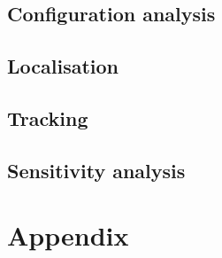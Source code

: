 \documentclass[10pt,a4paper]{report}
\begin{document}
\newpage
\section{Configuration analysis}
\label{Configuration analysis}

\newpage
\section{Localisation}
\label{Localisationg}

\newpage
\section{Tracking}
\label{Tracking}

\newpage
\section{Sensitivity analysis}
\label{Sensitivity analysis}

\chapter{Appendix}
\end{document}
